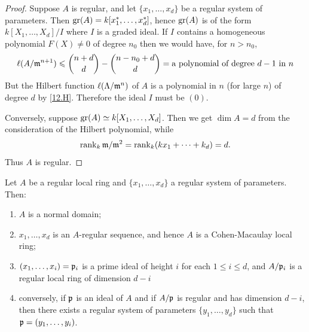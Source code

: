\documentclass[../main]{subfiles}
\begin{document}
\begin{proof}
  Suppose $A$ is regular, and let $\{x_1, \dots, x_d\}$ be a regular system of parameters. Then $\operatorname{gr}(A) = k[x_1^\ast,\dots,x_d^\ast]$, hence $\operatorname{gr}(A)$ is of the form $k[X_1, \ldots, X_d] / I$ where $I$ is a graded ideal. If $I$ contains a homogeneous polynomial $F(X) \neq 0$ of degree $n_0$ then we would have, for $n>n_0$,
  \[\ell(A/\mathfrak{m}^{n+1}) \leqslant \binom{n+d}d -\binom{n-n_0+d}d = \text{a polynomial of degree }d-1\text{ in }n\]
  But the Hilbert function $\ell(\Lambda/\mathfrak{m}^n)$ of $A$ is a polynomial in $n$ (for large $n$) of degree $d$ by \ref{12.H}. Therefore the ideal $I$ must be $(0)$.
  
  Conversely, suppose $\operatorname{gr}(A) \simeq k[X_1, \dots, X_d]$. Then we get $\dim A=d$ from the consideration of the Hilbert polynomial, while \[\operatorname{rank}_k \mathfrak{m} / \mathfrak{m}^2=\operatorname{rank}_k(k x_1+\dots+k_d)=d.\] Thus $A$ is regular.
\end{proof}

\begin{partheorem}\label{thm:036}
  Let $A$ be a regular local ring and $\{x_1, \ldots, x_d\}$ a regular system of parameters. Then:
  \begin{enumerate}[label=(\arabic*)]
  \item $A$ is a normal domain;

  \item $x_1, \ldots, x_d$ is an $A$-regular sequence, and hence $A$ is a Cohen-Macaulay local ring;

  \item $(x_1, \dots, x_i)=\mathfrak{p}_i$ is a prime ideal of height $i$ for each $1 \leqslant i \leqslant d$, and $A /\mathfrak{p}_i$ is a regular local ring of dimension $d-i$

  \item conversely, if $\mathfrak{p}$ is an ideal of $A$ and if $A / \mathfrak{p}$ is regular and has dimension $d-i$, then there exists a regular system of parameters $\{y_1, \ldots, y_d\}$ such that $\mathfrak{p}=(y_1, \dots, y_i)$.

\end{enumerate}
\end{partheorem}
\end{document}
